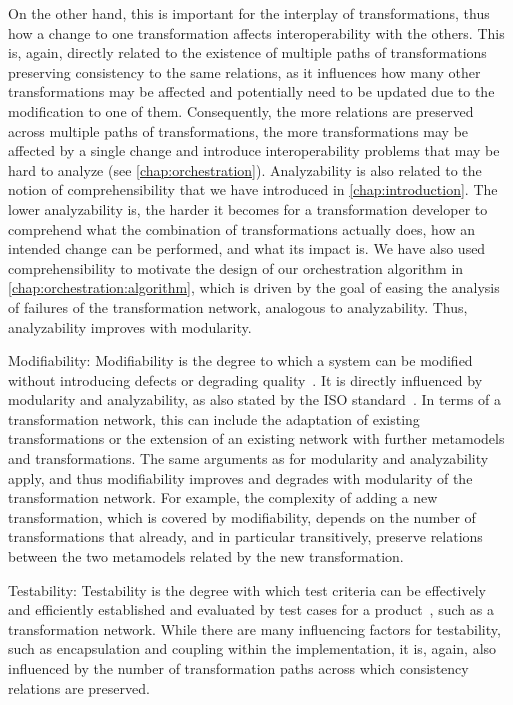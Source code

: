 \begin{properdescription}
    On the other hand, this is important for the interplay of transformations, thus how a change to one transformation affects interoperability with the others.
    This is, again, directly related to the existence of multiple paths of transformations preserving consistency to the same relations, as it influences how many other transformations may be affected and potentially need to be updated due to the modification to one of them.
    Consequently, the more relations are preserved across multiple paths of transformations, the more transformations may be affected by a single change and introduce interoperability problems that may be hard to analyze (see \autoref{chap:orchestration}).
    Analyzability is also related to the notion of comprehensibility that we have introduced in \autoref{chap:introduction}. The lower analyzability is, the harder it becomes for a transformation developer to comprehend what the combination of transformations actually does, how an intended change can be performed, and what its impact is.
    We have also used comprehensibility to motivate the design of our orchestration algorithm in \autoref{chap:orchestration:algorithm}, which is driven by the goal of easing the analysis of failures of the transformation network, analogous to analyzability.
    Thus, analyzability improves with modularity.
    \item[Modifiability:]
    Modifiability is the degree to which a system can be modified without introducing defects or degrading quality~\cite[p.~15]{iso25010}.
    It is directly influenced by modularity and analyzability, as also stated by the ISO standard~\cite[p.~15]{iso25010}.
    In terms of a transformation network, this can include the adaptation of existing transformations or the extension of an existing network with further metamodels and transformations.
    The same arguments as for modularity and analyzability apply, and thus modifiability improves and degrades with modularity of the transformation network.
    For example, the complexity of adding a new transformation, which is covered by modifiability, depends on the number of transformations that already, and in particular transitively, preserve relations between the two metamodels related by the new transformation.
    \item[Testability:]
    Testability is the degree with which test criteria can be effectively and efficiently established and evaluated by test cases for a product~\cite[p.~15]{iso25010}, such as a transformation network.
    While there are many influencing factors for testability, such as encapsulation and coupling within the implementation, it is, again, also influenced by the number of transformation paths across which consistency relations are preserved.

\end{properdescription}

